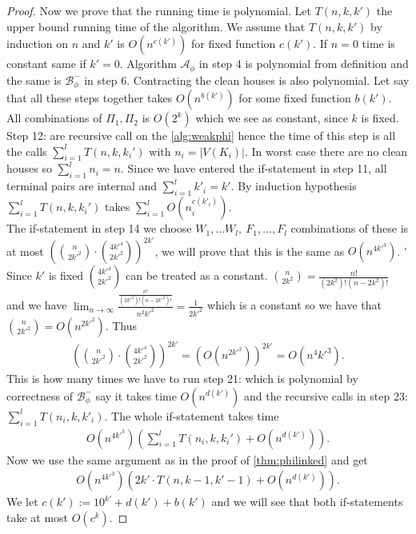 \begin{proof}
    Now we prove that the running time is polynomial.
    Let $T(n,k,k')$ the upper bound running time of the algorithm.
    We assume that $T(n,k,k')$ by induction on $n$ and $k'$ is $O(n^{c(k')})$ for fixed function $c(k')$.
    If $n=0$ time is constant same if $k'=0$.
    Algorithm $\mathcal{A}_\phi$ in step 4 is polynomial from definition and the same is $\mathcal{B}_\phi^-$ in step 6. Contracting the clean houses is also polynomial. Let say that all these steps together takes $O(n^{b(k')})$ for some fixed function $b(k')$.
    All combinations of $\Pi_1,\Pi_2$ is $O(2^k)$ which we see as constant, since $k$ is fixed.
    Step 12: are recursive call on the \autoref{alg:weakphi} hence the time of this step is all the calls $\sum_{i=1}^lT(n,k,k_i')$ with $n_i=|V(K_i)|$. 
    In worst case there are no clean houses so $\sum_{i=1}^ln_i=n$.
    Since we have entered the if-statement in step 11, all terminal pairs are internal and $\sum_{i=1}^lk'_i=k'$.
    By induction hypothesis $\sum_{i=1}^lT(n,k,k_i')$ takes $\sum_{i=1}^lO(n_i^{c(k'_i)})$.\\
    The if-statement in step 14 we choose $W_1,\dots W_l,\ F_1,\dots ,F_l$ combinations of these is at most $\left( {{n}\choose {2k'^2}}\cdot {{4k'^4}\choose {2k'^2}}\right) ^{2k'}$, we will prove that this is the same as $O(n^{4k'^3})$. '
    Since $k'$ is fixed ${{4k'^4}\choose {2k'^2}}$ can be treated as a constant.
    ${{n}\choose {2k^2}}=\frac{n!}{(2k^2)!(n-2k^2)!}$ and we have $\lim_{n\rightarrow \infty}\frac{\frac{n!}{(2k'^2)!(n-2k'^2)!}}{n^2k'^2}=\frac{1}{2k'^2}$ which is a constant so we have that ${{n}\choose {2k'^2}}=O(n^{2k'^2})$.
    Thus
    \begin{align*}
        \left( {{n}\choose {2k'^2}}\cdot {{4k'^4}\choose {2k'^2}}\right) ^{2k'}=\left(O(n^{2k'^2})\right)^{2k'}=O(n^4k'^3).
    \end{align*}
    This is how many times we have to run step 21: which is polynomial by correctness of $\mathcal{B}_\phi^-$ say it takes time $O(n^{d(k')})$ and the recursive calls in step 23: $\sum_{i=1}^lT(n_i,k,k'_i)$. 
    The whole if-statement takes time
    \begin{align}
        O(n^{4k'^3})(\sum_{i=1}^lT(n_i,k,k_i')+O(n^{d(k')})).
    \end{align}
    Now we use the same argument as in the proof of \autoref{thm:philinked} and get 
    \begin{align}
        O(n^{4k'^3})(2k'\cdot T(n,k-1,k'-1)+O(n^{d(k')})).
    \end{align}
    We let $c(k'):=10^{k'}+d(k')+b(k')$ and we will see that both if-statements take at most $O(c^k)$.

\end{proof}
